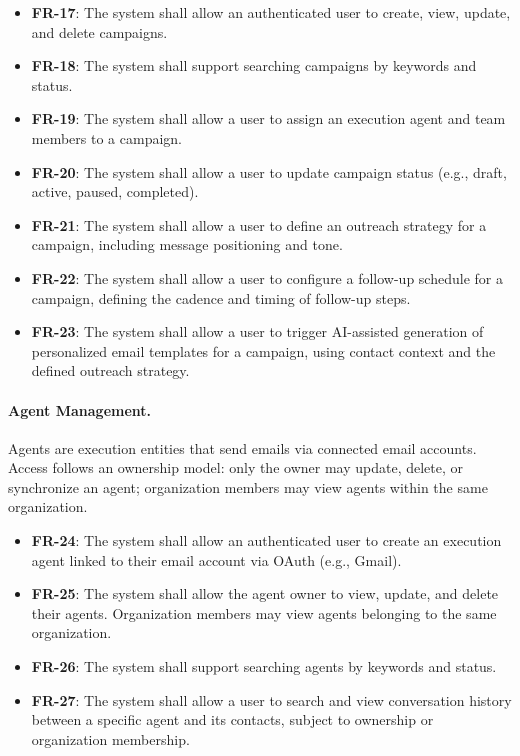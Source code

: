 \begin{itemize}
    \item \textbf{FR-17}: The system shall allow an authenticated user to create, view, update, and delete campaigns.
    \item \textbf{FR-18}: The system shall support searching campaigns by keywords and status.
    \item \textbf{FR-19}: The system shall allow a user to assign an execution agent and team members to a campaign.
    \item \textbf{FR-20}: The system shall allow a user to update campaign status (e.g., draft, active, paused, completed).
    \item \textbf{FR-21}: The system shall allow a user to define an outreach strategy for a campaign, including message positioning and tone.
    \item \textbf{FR-22}: The system shall allow a user to configure a follow-up schedule for a campaign, defining the cadence and timing of follow-up steps.
    \item \textbf{FR-23}: The system shall allow a user to trigger AI-assisted generation of personalized email templates for a campaign, using contact context and the defined outreach strategy.
\end{itemize}

\paragraph{Agent Management.}
Agents are execution entities that send emails via connected email accounts. Access follows an ownership model: only the owner may update, delete, or synchronize an agent; organization members may view agents within the same organization.

\begin{itemize}
    \item \textbf{FR-24}: The system shall allow an authenticated user to create an execution agent linked to their email account via OAuth (e.g., Gmail).
    \item \textbf{FR-25}: The system shall allow the agent owner to view, update, and delete their agents. Organization members may view agents belonging to the same organization.
    \item \textbf{FR-26}: The system shall support searching agents by keywords and status.
    \item \textbf{FR-27}: The system shall allow a user to search and view conversation history between a specific agent and its contacts, subject to ownership or organization membership.
\end{itemize}

